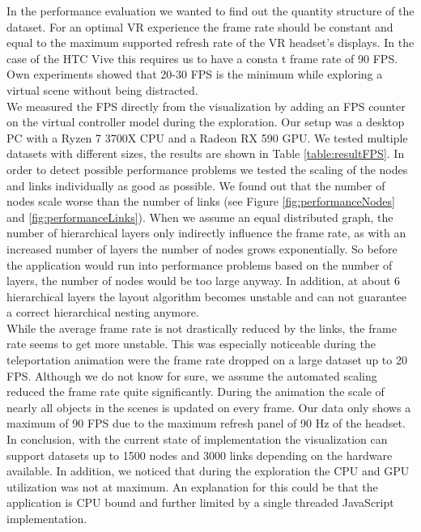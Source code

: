 In the performance evaluation we wanted to find out the quantity structure of the dataset. 
For an optimal VR experience the frame rate should be constant and equal to the maximum supported refresh rate of the VR headset's displays. In the case of the HTC Vive this requires us to have a consta t frame rate of 90 FPS.
Own experiments showed that 20-30 FPS is the minimum while exploring a virtual scene without being distracted.
\\
We measured the FPS directly from the visualization by adding an FPS counter on the virtual controller model during the exploration. Our setup was a desktop PC with a Ryzen 7 3700X CPU and a Radeon RX 590 GPU. 
We tested multiple datasets with different sizes, the results are shown in Table \ref{table:resultFPS}. 
In order to detect possible performance problems we tested the scaling of the nodes and links individually as good as possible.
We found out that the number of nodes scale worse than the number of links (see Figure \ref{fig:performanceNodes} and \ref{fig:performanceLinks}). 
When we assume an equal distributed graph, the number of hierarchical layers only indirectly influence the frame rate, as with an increased number of layers the number of nodes grows exponentially. 
So before the application would run into performance problems based on the number of layers, the number of nodes would be too large anyway. 
In addition, at about 6 hierarchical layers the layout algorithm becomes unstable and can not guarantee a correct hierarchical nesting anymore.
\\
While the average frame rate is not drastically reduced by the links, the frame rate seems to get more unstable. 
This was especially noticeable during the teleportation animation were the frame rate dropped on a large dataset up to 20 FPS. 
Although we do not know for sure, we assume the automated scaling reduced the frame rate quite significantly. During the animation the scale of nearly all objects in the scenes is updated on every frame.
Our data only shows a maximum of 90 FPS due to the maximum refresh panel of 90 Hz of the headset.
\\
In conclusion, with the current state of implementation the visualization can support datasets up to 1500 nodes and 3000 links depending on the hardware available.
In addition, we noticed that during the exploration the CPU and GPU utilization was not at maximum. An explanation for this could be that the application is CPU bound and further limited by a single threaded JavaScript implementation.

